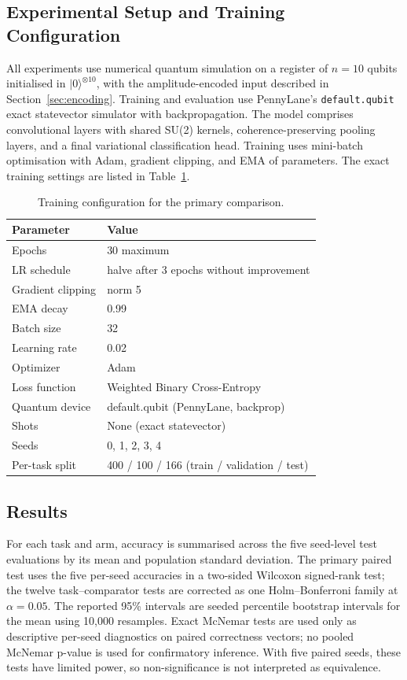 \documentclass[conference]{IEEEtran}
\begin{document}
\subsection{Experimental Setup and Training Configuration}
All experiments use numerical quantum simulation on a register of $n = 10$ qubits initialised in $|0\rangle^{\otimes 10}$, with the amplitude-encoded input described in Section~\ref{sec:encoding}. Training and evaluation use PennyLane's \texttt{default.qubit} exact statevector simulator with backpropagation. The model comprises convolutional layers with shared SU(2) kernels, coherence-preserving pooling layers, and a final variational classification head. Training uses mini-batch optimisation with Adam, gradient clipping, and EMA of parameters. The exact training settings are listed in Table~\ref{tab:training}.

\begin{table}[!t]
\caption{Training configuration for the primary comparison.}
\label{tab:training}
\centering
\begin{tabular}{ll}
\toprule
\textbf{Parameter} & \textbf{Value} \\
\midrule
Epochs & 30 maximum \\
LR schedule & halve after 3 epochs without improvement \\
Gradient clipping & norm 5 \\
EMA decay & 0.99 \\
Batch size & 32 \\
Learning rate & 0.02 \\
Optimizer & Adam \\
Loss function & Weighted Binary Cross-Entropy \\
Quantum device & default.qubit (PennyLane, backprop) \\
Shots & None (exact statevector) \\
Seeds & 0, 1, 2, 3, 4 \\
Per-task split & 400 / 100 / 166 (train / validation / test) \\
\bottomrule
\end{tabular}
\end{table}

\subsection{Results}
\label{sec:results}

For each task and arm, accuracy is summarised across the five seed-level test
evaluations by its mean and population standard deviation. The primary paired
test uses the five per-seed accuracies in a two-sided Wilcoxon signed-rank test;
the twelve task--comparator tests are corrected as one Holm--Bonferroni family at
$\alpha=0.05$. The reported 95\% intervals are seeded percentile bootstrap
intervals for the mean using 10,000 resamples. Exact McNemar tests are used only
as descriptive per-seed diagnostics on paired correctness vectors; no pooled
McNemar p-value is used for confirmatory inference. With five paired seeds, these
tests have limited power, so non-significance is not interpreted as equivalence.
\end{document}

